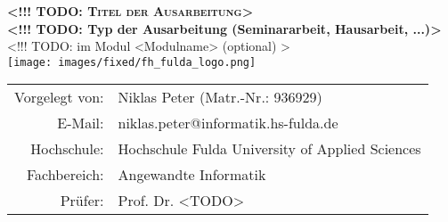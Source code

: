 \thispagestyle{plain}
\begin{titlepage}

\begin{center}

\huge{\textbf{\textsc{<!!! TODO: Titel der Ausarbeitung>}}}\\[1.5ex]

\LARGE{\textbf{<!!! TODO: Typ der Ausarbeitung (Seminararbeit, Hausarbeit, ...)>}}\\[1.5ex]
\Large{<!!! TODO: im Modul <Modulname> (optional) >}\\[6ex]
\vfill
\texttt{[image: images/fixed/fh\_fulda\_logo.png]}\\[3ex]

\normalsize
 \vfill
\begin{tabular}{rl}
 Vorgelegt von: &  Niklas Peter (Matr.-Nr.: 936929) \\[0ex]
 E-Mail: & niklas.peter@informatik.hs-fulda.de \\
 Hochschule: & Hochschule Fulda \textendash{} University of Applied Sciences \\[0ex]
 Fachbereich: & Angewandte Informatik \\[0ex]
 Prüfer:         & Prof. Dr. <TODO> \\[0ex]
\end{tabular}
\end{center}		

\singlespacing
\small
\begin{center}
\npHandoverDate
\end{center}

\end{titlepage}


